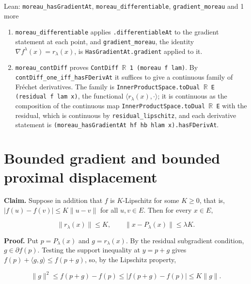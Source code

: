 \documentclass[11pt,a4paper]{article}
\begin{document}
\begin{leanbox}{Lean: \texttt{moreau\_\allowbreak{}hasGradientAt}, \texttt{moreau\_\allowbreak{}differentiable}, \texttt{gradient\_\allowbreak{}moreau} and 1 more}
\begin{enumerate}
\item \texttt{moreau\_\allowbreak{}differentiable} applies \texttt{.\allowbreak{}differentiable\allowbreak{}At} to the gradient statement at each point, and \texttt{gradient\_\allowbreak{}moreau}, the identity \(\nabla f^\lambda(x)=r_\lambda(x)\), is \texttt{Has\allowbreak{}Gradient\allowbreak{}At.\allowbreak{}gradient} applied to it.

\item \texttt{moreau\_\allowbreak{}cont\allowbreak{}Diff} proves \texttt{Cont\allowbreak{}Diff \ensuremath{\mathbb R} 1 (moreau f lam)}. By \texttt{cont\allowbreak{}Diff\_\allowbreak{}one\_\allowbreak{}iff\_\allowbreak{}has\allowbreak{}FDeriv\allowbreak{}At} it suffices to give a continuous family of Fréchet derivatives. The family is \texttt{Inner\allowbreak{}Product\allowbreak{}Space.\allowbreak{}to\allowbreak{}Dual \ensuremath{\mathbb R} E (residual f lam x)}, the functional \(\langle r_\lambda(x),\cdot\rangle\); it is continuous as the composition of the continuous map \texttt{Inner\allowbreak{}Product\allowbreak{}Space.\allowbreak{}to\allowbreak{}Dual \ensuremath{\mathbb R} E} with the residual, which is continuous by \texttt{residual\_\allowbreak{}lipschitz}, and each derivative statement is \texttt{(moreau\_\allowbreak{}has\allowbreak{}Gradient\allowbreak{}At hf hb hlam x).\allowbreak{}has\allowbreak{}FDeriv\allowbreak{}At}.

\end{enumerate}
\end{leanbox}

\section{\texorpdfstring{Bounded gradient and bounded proximal displacement}{Bounded gradient and bounded proximal displacement}}


\textbf{Claim.} Suppose in addition that \(f\) is \(K\)-Lipschitz for some \(K\ge0\), that is, \(|f(u)-f(v)|\le K\|u-v\|\) for all \(u,v\in E\). Then for every \(x\in E\),


\[\|r_\lambda(x)\|\le K,\qquad\|x-P_\lambda(x)\|\le\lambda K.\]


\textbf{Proof.} Put \(p=P_\lambda(x)\) and \(g=r_\lambda(x)\). By the residual subgradient condition, \(g\in\partial f(p)\). Testing the support inequality at \(y=p+g\) gives \(f(p)+\langle g,g\rangle\le f(p+g)\), so, by the Lipschitz property,


\[\|g\|^2\le f(p+g)-f(p)\le|f(p+g)-f(p)|\le K\|g\|.\]
\end{document}
